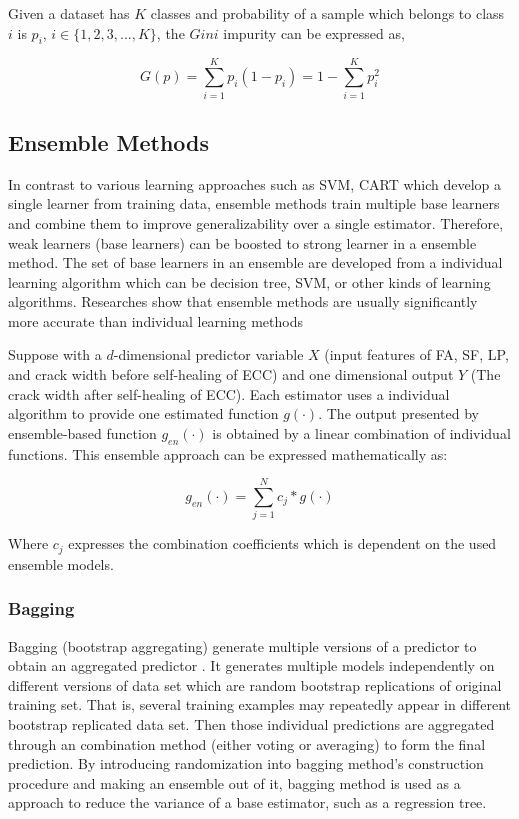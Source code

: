 \documentclass[11pt]{article}
\begin{document}
	Given a dataset has $K$ classes and probability of a sample which belongs to class $i$ is $p_i$, $i \in \{1,2,3,...,K\}$, the $Gini$ impurity can be expressed as,
	
	\begin{equation}
	G(p) = \sum_{i=1}^{K}p_i(1-p_i) = 1- \sum_{i=1}^{K}p_i^2
	\end{equation}
	
	
	\subsection{Ensemble Methods}
	
	In contrast to various learning approaches such as SVM, CART which develop a single learner from training data, ensemble methods train multiple base learners and combine them \cite{chou2014machine} to improve generalizability over a single estimator. Therefore, weak learners (base learners) can be boosted to strong learner \cite{frosyniotis2003divide} in a ensemble method. The set of base learners in an ensemble are developed from a individual learning algorithm which can be decision tree, SVM, or other kinds of learning algorithms. Researches \cite{dietterich2000ensemble} show that ensemble methods are usually significantly more accurate than individual learning methods  
	
	Suppose with a $d$-dimensional predictor variable $X$ (input features of FA, SF, LP, and crack width before self-healing of ECC) and one dimensional output $Y$ (The crack width after self-healing of ECC). Each estimator uses a individual algorithm to provide one estimated function $g(\cdot)$. The output presented by ensemble-based function $g_{en}(\cdot)$ is obtained by a linear combination of individual functions. This ensemble approach can be expressed mathematically as:
	
	\begin{equation}
	g_{en}(\cdot) = \sum_{j=1}^{N}c_j *g(\cdot)
	\end{equation}
	
	Where $c_j$ expresses the combination coefficients which is dependent on the used ensemble models.  
	
	\subsubsection{Bagging}
	
	Bagging (bootstrap aggregating) generate multiple versions of a predictor to obtain an aggregated predictor \cite{breiman1996bagging}. It generates multiple models independently on different versions of data set which are random bootstrap replications of original training set. That is, several training examples may repeatedly appear in different bootstrap replicated data set. Then those individual predictions are aggregated through an combination method (either voting or averaging) to form the final prediction. By introducing randomization into bagging method's construction procedure and making an ensemble out of it, bagging method is used as a approach to reduce the variance of a base estimator, such as a regression tree. 
	
\end{document}
